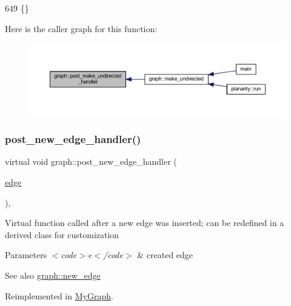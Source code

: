 \begin{DoxyCode}
649 \{\}
\end{DoxyCode}
Here is the caller graph for this function\+:
\nopagebreak
\begin{figure}[H]
\begin{center}
\leavevmode
\includegraphics[width=350pt]{classgraph_a3d2bc348d12931aff1d2e97a6b4285c3_icgraph}
\end{center}
\end{figure}
\mbox{\label{classgraph_a443182426b461aa9f4b1c9f5ac535179}} 
\subsubsection{\texorpdfstring{post\+\_\+new\+\_\+edge\+\_\+handler()}{post\_new\_edge\_handler()}}
{\footnotesize\ttfamily virtual void graph\+::post\+\_\+new\+\_\+edge\+\_\+handler (\begin{DoxyParamCaption}\item[{\mbox{\hyperlink{classedge}{edge}}}]{ }\end{DoxyParamCaption})\hspace{0.3cm}{\ttfamily [inline]}, {\ttfamily [virtual]}}

Virtual function called after a new edge was inserted; can be redefined in a derived class for customization


\begin{DoxyParams}{Parameters}
{\em $<$code$>$e$<$/code$>$} & created edge \\
\hline
\end{DoxyParams}
\begin{DoxySeeAlso}{See also}
\mbox{\hyperlink{classgraph_a02a0c3a219f75d68caa408ef339d4a1c}{graph\+::new\+\_\+edge}} 
\end{DoxySeeAlso}


Reimplemented in \mbox{\hyperlink{class_my_graph_a7d8f03bae7c6a731718385ae4e546d98}{My\+Graph}}.



